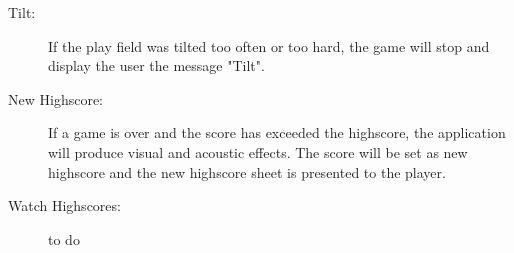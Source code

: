 \documentclass[fontsize=12pt,
               paper=a4,
               twoside=false,
               parskip=half,
               ]{scrartcl}
\begin{document}
\begin{description}
\item[Tilt:] If the play field was tilted too often or too hard, the game will stop and display the user the message "Tilt".

\item[New Highscore:] If a game is over and the score has exceeded the highscore, the application will produce visual and acoustic effects. The score will be set as new highscore and the new highscore sheet is presented to the player.

\item[Watch Highscores:] 
to do

\end{description}









\end{document}
